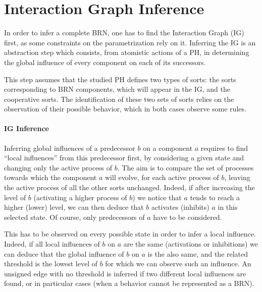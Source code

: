 \section{Interaction Graph Inference}\label{sec:infer-IG}

In order to infer a complete BRN, one has to find the Interaction Graph (IG) first, as some constraints on the parametrization rely on it.
Inferring the IG is an abstraction step which consists, from atomistic actions of a PH, in determining the global influence of every component on each of its successors.

This step assumes that the studied PH defines two types of sorts: the sorts corresponding to BRN components, which will appear in the IG, and the cooperative sorts.
The identification of these two sets of sorts relies on the observation of their possible behavior, which in both cases observe some rules.



\paragraph{IG Inference}\label{ssec:infer-IG}
%
Inferring global influences of a predecessor $b$ on a component $a$ requires to find “local influences” from this predecessor first, by considering a given state and changing only the active process of $b$.
The aim is to compare the set of processes towards which the component $a$ will evolve, for each active process of $b$, leaving the active process of all the other sorts unchanged.
Indeed, if after increasing the level of $b$ (\ie activating a higher process of $b$) we notice that $a$ tends to reach a higher (\resp lower) level, we can then deduce that $b$ activates (\resp inhibits) $a$ in this selected state.
Of course, only predecessors of $a$ have to be considered.

This has to be observed on every possible state in order to infer a local influence.
Indeed, if all local influences of $b$ on $a$ are the same (activations or inhibitions) we can deduce that the global influence of $b$ on $a$ is the also same, and the related threshold is the lowest level of $b$ for which we can observe such an influence.
An unsigned edge with no threshold is inferred if two different local influences are found, or in particular cases (when a behavior cannot be represented as a BRN).

